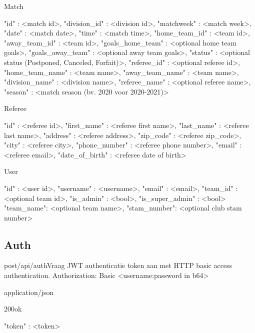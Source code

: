 \documentclass[10pt]{article}
\begin{document}
Match
\vspace{2em}
\begin{routeResponseItemBody}
{ 
	"id" : <match id>,
	"division_id" : <division id>,
	"matchweek" : <match week>,
	"date" : <match date>,
	"time" : <match time>,
	"home_team_id" : <team id>,
	"away_team_id" : <team id>,
	"goals_home_team" : <optional home team goals>,
	"goals_away_team" : <optional away team goals>,
	"status" : <optional status (Postponed, Canceled, Forfait)>,
	"referee_id" : <optional referee id>,
	"home_team_name" : <team name>,
	"away_team_name" : <team name>,
	"division_name" : <division name>,
	"referee_name" : <optional referee name>,
	"season" : <match season (bv. 2020 voor 2020-2021)>
}
\end{routeResponseItemBody}

Referee
\vspace{2em}
\begin{routeResponseItemBody}
{ 
	"id" : <referee id>,
	"first_name" : <referee first name>,
	"last_name" : <referee last name>,
	"address" : <referee address>,
	"zip_code" : <referee zip_code>,
	"city" : <referee city>,
	"phone_number" : <referee phone number>,
	"email" : <referee email>,
	"date_of_birth" : <referee date of birth>
}
\end{routeResponseItemBody}

User
\vspace{2em}
\begin{routeResponseItemBody}
{ 
	"id" : <user id>,
	"username" : <username>,
	"email" : <email>,
	"team_id" : <optional team id>,
	"is_admin" : <bool>,
	"is_super_admin" : <bool>
	"team_name": <optional team name>,
	"stam_number": <optional club stam number>
}
\end{routeResponseItemBody}

\clearpage
\subsection{Auth}

\vspace{2em}

\begin{apiRoute}{post}{/api/auth}{Vraag JWT authenticatie token aan met HTTP basic access authentication.}
 Authorization: Basic <username:password in b64>
	\begin{routeResponse}{application/json}
		\begin{routeResponseItem}{200}{ok}
			\begin{routeResponseItemBody}
{ 
	"token" : <token>
}
			\end{routeResponseItemBody}
		\end{routeResponseItem}
	\end{routeResponse}
\end{apiRoute}
\end{document}
